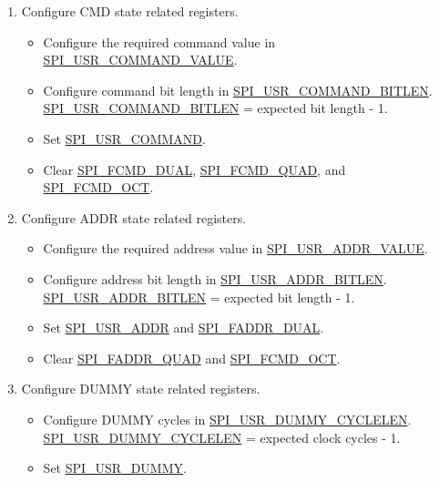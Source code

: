 \documentclass[main\_\_EN.tex]{subfiles}
\begin{document}
\begin{enumerate}
    \item Configure CMD state related registers.
        \begin{itemize}
            \item Configure the required command value in \hyperref[fielddesc:SPIUSRCOMMANDVALUE]{SPI\_USR\_COMMAND\_VALUE}.
            \item Configure command bit length in \hyperref[fielddesc:SPIUSRCOMMANDBITLEN]{SPI\_USR\_COMMAND\_BITLEN}. \hyperref[fielddesc:SPIUSRCOMMANDBITLEN]{SPI\_USR\_COMMAND\_BITLEN} = expected bit length - 1.
            \item Set \hyperref[fielddesc:SPIUSRCOMMAND]{SPI\_USR\_COMMAND}.
            \item Clear \hyperref[fielddesc:SPIFCMDDUAL]{SPI\_FCMD\_DUAL}, \hyperref[fielddesc:SPIFCMDQUAD]{SPI\_FCMD\_QUAD}, and \hyperref[fielddesc:SPIFCMDOCT]{SPI\_FCMD\_OCT}.
        \end{itemize}

    \item Configure ADDR state related registers.
        \begin{itemize}
            \item Configure the required address value in \hyperref[fielddesc:SPIUSRADDRVALUE]{SPI\_USR\_ADDR\_VALUE}.
            \item Configure address bit length in \hyperref[fielddesc:SPIUSRADDRBITLEN]{SPI\_USR\_ADDR\_BITLEN}. \hyperref[fielddesc:SPIUSRADDRBITLEN]{SPI\_USR\_ADDR\_BITLEN} = expected bit length - 1.
            \item Set \hyperref[fielddesc:SPIUSRADDR]{SPI\_USR\_ADDR} and \hyperref[fielddesc:SPIFADDRDUAL]{SPI\_FADDR\_DUAL}.
            \item Clear \hyperref[fielddesc:SPIFADDRQUAD]{SPI\_FADDR\_QUAD} and \hyperref[fielddesc:SPIFCMDOCT]{SPI\_FCMD\_OCT}.
        \end{itemize}

    \item Configure DUMMY state related registers.
        \begin{itemize}
            \item Configure DUMMY cycles in \hyperref[fielddesc:SPIUSRDUMMYCYCLELEN]{SPI\_USR\_DUMMY\_CYCLELEN}. \hyperref[fielddesc:SPIUSRDUMMYCYCLELEN]{SPI\_USR\_DUMMY\_CYCLELEN} = expected clock cycles - 1.
            \item Set \hyperref[fielddesc:SPIUSRDUMMY]{SPI\_USR\_DUMMY}.
        \end{itemize}


\end{enumerate}
\end{document}
